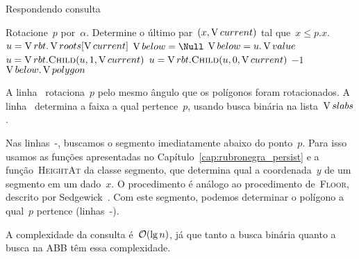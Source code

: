 \documentclass[main.tex]{subfiles}
\begin{document}
\begin{algorithm}
\caption{Respondendo consulta} \label{lst:conpl}
\begin{algorithmic}[1]

	\State Rotacione~$p$ por~$\alpha$. \label{line:conpl:rot}
	\State Determine o último par~$(x, \operatorname{V}{current})$ tal que~$x \leq p.x$.  \label{line:conpl:bb}
	\State $u = \operatorname{V}{rbt}.\operatorname{V}{roots}[\operatorname{V}{current}]$ \label{line:conpl:ceilb}
	\State $\below = \Null$
		 
			\State $\operatorname{V}{below} = u.\operatorname{V}{value}$
			\State $u = \rbt.\Call{Child}{u, 1, \current}$
		\Else
			\State $u = \rbt.\Call{Child}{u, 0, \current}$
		\EndIf
	\EndWhile \label{line:conpl:ceile}
	\If{$\below = \Null$} \label{line:conpl:retb}
		\State \Return $-1$
	\Else
		\State \Return $\operatorname{V}{below}.\operatorname{V}{polygon}$
	\EndIf \label{line:conpl:rete}
\EndFunction

\end{algorithmic}
\end{algorithm}

A linha~ rotaciona~$p$ pelo mesmo ângulo que os polígonos foram rotacionados. A linha~ determina a faixa a qual pertence~$p$, usando busca binária na lista~$\operatorname{V}{slabs}$.

Nas linhas~\mbox{-}, buscamos o segmento imediatamente abaixo do ponto~$p$. Para isso usamos as funções apresentadas no Capítulo~\ref{cap:rubronegra_persist} e a função~\textsc{HeightAt} da classe segmento, que determina qual a coordenada~$y$ de um segmento em um dado~$x$. O procedimento é análogo ao procedimento de~\textsc{Floor}, descrito por Sedgewick~\cite{Sedgewick}. Com este segmento, podemos determinar o polígono a qual~$p$ pertence (linhas~\mbox{-}).

A complexidade da consulta é~$\mathcal{O}(\lg n)$, já que tanto a busca binária quanto a busca na ABB têm essa complexidade.
\end{document}
